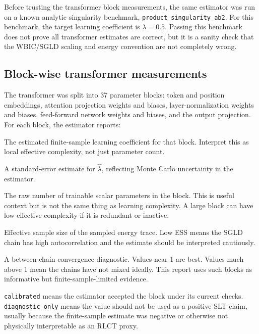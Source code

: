 \documentclass[11pt]{article}
\begin{document}
Before trusting the transformer block measurements, the same estimator was run
on a known analytic singularity benchmark, \texttt{product\_singularity\_ab2}.
For this benchmark, the target learning coefficient is \(\lambda=0.5\). Passing
this benchmark does not prove all transformer estimates are correct, but it is a
sanity check that the WBIC/SGLD scaling and energy convention are not completely
wrong.

\subsection{Block-wise transformer measurements}

The transformer was split into 37 parameter blocks: token and position
embeddings, attention projection weights and biases, layer-normalization weights
and biases, feed-forward network weights and biases, and the output projection.
For each block, the estimator reports:

\begin{description}[leftmargin=*]
\item[\(\hat\lambda\)] The estimated finite-sample learning coefficient for that
block. Interpret this as local effective complexity, not just parameter count.
\item[SE] A standard-error estimate for \(\hat\lambda\), reflecting Monte Carlo
uncertainty in the estimator.
\item[Number of parameters] The raw number of trainable scalar parameters in the
block. This is useful context but is not the same thing as learning complexity.
A large block can have low effective complexity if it is redundant or inactive.
\item[Energy ESS per chain] Effective sample size of the sampled energy trace.
Low ESS means the SGLD chain has high autocorrelation and the estimate should be
interpreted cautiously.
\item[Energy Rhat] A between-chain convergence diagnostic. Values near 1 are
best. Values much above 1 mean the chains have not mixed ideally. This report
uses such blocks as informative but finite-sample-limited evidence.
\item[Status] \texttt{calibrated} means the estimator accepted the block under
its current checks. \texttt{diagnostic\_only} means the value should not be used
as a positive SLT claim, usually because the finite-sample estimate was negative
or otherwise not physically interpretable as an RLCT proxy.
\end{description}
\end{document}
